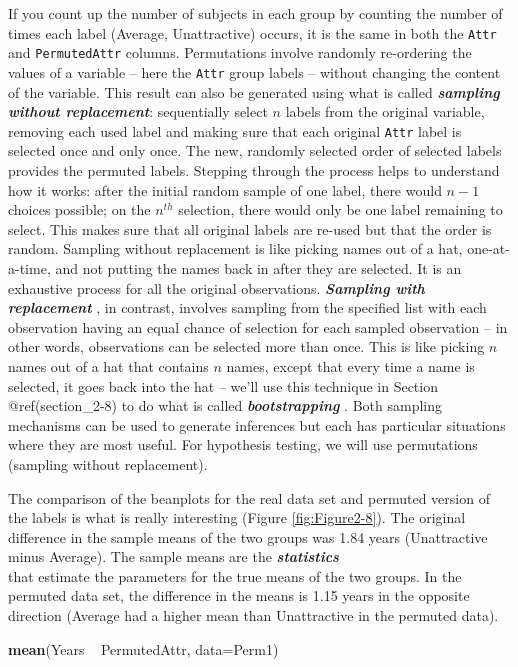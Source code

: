 \documentclass[]{book}
\newenvironment{Shaded}{\begin{snugshade}}{\end{snugshade}}
\newcommand{\KeywordTok}[1]{\textcolor[rgb]{0.13,0.29,0.53}{\textbf{{#1}}}}
\newcommand{\DataTypeTok}[1]{\textcolor[rgb]{0.13,0.29,0.53}{{#1}}}
\newcommand{\StringTok}[1]{\textcolor[rgb]{0.31,0.60,0.02}{{#1}}}
\newcommand{\NormalTok}[1]{{#1}}
\begin{document}
If you count up the number of subjects in each group by counting the
number of times each label (Average, Unattractive) occurs, it is the
same in both the \texttt{Attr} and \texttt{PermutedAttr} columns.
Permutations involve randomly re-ordering the values of a variable --
here the \texttt{Attr} group labels -- without changing the content of
the variable. This result can also be generated using what is called
\textbf{\emph{sampling without replacement}}: sequentially select \(n\)
labels from the original variable, removing each used label and making
sure that each original \texttt{Attr} label is selected once and only
once. The new, randomly selected order of selected labels provides the
permuted labels. Stepping through the process helps to understand how it
works: after the initial random sample of one label, there would
\(n - 1\) choices possible; on the \(n^{th}\) selection, there would
only be one label remaining to select. This makes sure that all original
labels are re-used but that the order is random. Sampling without
replacement is like picking names out of a hat, one-at-a-time, and not
putting the names back in after they are selected. It is an exhaustive
process for all the original observations. \textbf{\emph{Sampling with
replacement}} , in contrast, involves sampling from the specified list
with each observation having an equal chance of selection for each
sampled observation -- in other words, observations can be selected more
than once. This is like picking \(n\) names out of a hat that contains
\(n\) names, except that every time a name is selected, it goes back
into the hat -- we'll use this technique in Section @ref(section\_2-8)
to do what is called \textbf{\emph{bootstrapping}} . Both sampling
mechanisms can be used to generate inferences but each has particular
situations where they are most useful. For hypothesis testing, we will
use permutations (sampling without replacement).

The comparison of the beanplots for the real data set and permuted
version of the labels is what is really interesting (Figure
\ref{fig:Figure2-8}). The original difference in the sample means of the
two groups was 1.84 years (Unattractive minus Average). The sample means
are the \textbf{\emph{statistics}}\\
that estimate the parameters for the true means of the two groups. In
the permuted data set, the difference in the means is 1.15 years in the
opposite direction (Average had a higher mean than Unattractive in the
permuted data).

\begin{Shaded}
\begin{Highlighting}[]
\KeywordTok{mean}\NormalTok{(Years ~}\StringTok{ }\NormalTok{PermutedAttr, }\DataTypeTok{data=}\NormalTok{Perm1)}
\end{Highlighting}
\end{Shaded}
\end{document}
